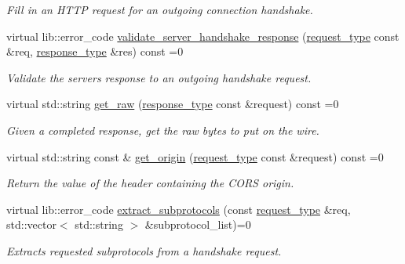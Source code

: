 \begin{DoxyCompactItemize}
\begin{DoxyCompactList}\small\item\em Fill in an H\+T\+T\+P request for an outgoing connection handshake. \end{DoxyCompactList}\item 
virtual lib\+::error\+\_\+code \hyperlink{classwebsocketpp_1_1processor_1_1processor_a2567795de600f5e19cb8f5c205c32bac}{validate\+\_\+server\+\_\+handshake\+\_\+response} (\hyperlink{classwebsocketpp_1_1processor_1_1processor_ac3926102ce2422e6b40ccea41e764233}{request\+\_\+type} const \&req, \hyperlink{classwebsocketpp_1_1processor_1_1processor_aa8d088af1bdb838f1e86df6cf4395981}{response\+\_\+type} \&res) const  =0
\begin{DoxyCompactList}\small\item\em Validate the server\textquotesingle{}s response to an outgoing handshake request. \end{DoxyCompactList}\item 
virtual std\+::string \hyperlink{classwebsocketpp_1_1processor_1_1processor_a81d3854b9afaeb9111679361ad2571f8}{get\+\_\+raw} (\hyperlink{classwebsocketpp_1_1processor_1_1processor_aa8d088af1bdb838f1e86df6cf4395981}{response\+\_\+type} const \&request) const  =0
\begin{DoxyCompactList}\small\item\em Given a completed response, get the raw bytes to put on the wire. \end{DoxyCompactList}\item 
virtual std\+::string const \& \hyperlink{classwebsocketpp_1_1processor_1_1processor_ac62df5d61e89b5ad150c1ce31f77a07c}{get\+\_\+origin} (\hyperlink{classwebsocketpp_1_1processor_1_1processor_ac3926102ce2422e6b40ccea41e764233}{request\+\_\+type} const \&request) const  =0
\begin{DoxyCompactList}\small\item\em Return the value of the header containing the C\+O\+R\+S origin. \end{DoxyCompactList}\item 
virtual lib\+::error\+\_\+code \hyperlink{classwebsocketpp_1_1processor_1_1processor_abec64a667b46855187d821abcb7a5247}{extract\+\_\+subprotocols} (const \hyperlink{classwebsocketpp_1_1processor_1_1processor_ac3926102ce2422e6b40ccea41e764233}{request\+\_\+type} \&req, std\+::vector$<$ std\+::string $>$ \&subprotocol\+\_\+list)=0
\begin{DoxyCompactList}\small\item\em Extracts requested subprotocols from a handshake request. \end{DoxyCompactList}\item 

\end{DoxyCompactItemize}
